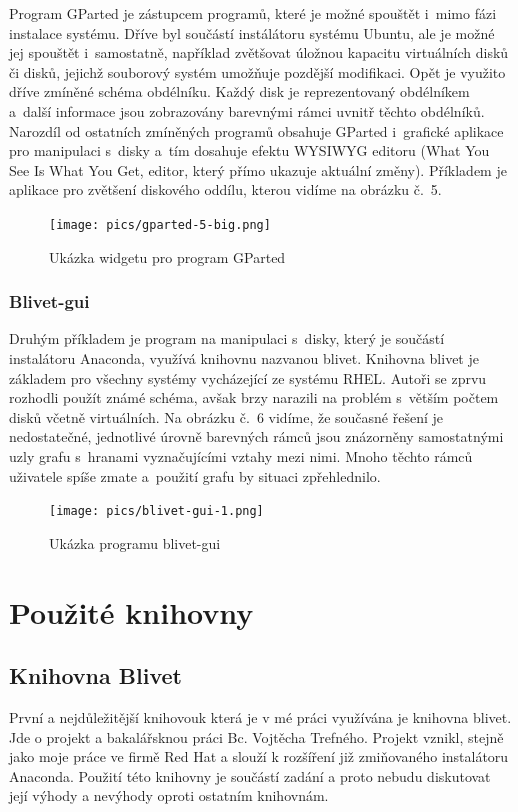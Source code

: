 \documentclass[color,table,oneside,nolot,nolof]{fithesis}
\begin{document}
Program GParted je zástupcem programů, které je možné spouštět i~mimo fázi instalace systému. Dříve byl součástí instálátoru systému Ubuntu, ale je možné jej spouštět i~samostatně, například 
 zvětšovat úložnou kapacitu virtuálních disků či disků, jejichž souborový systém umožňuje pozdější modifikaci. Opět je využito dříve zmíněné schéma obdélníku. Každý disk je reprezentovaný 
 obdélníkem a~další informace jsou zobrazovány barevnými rámci uvnitř těchto obdélníků. Narozdíl od ostatních zmíněných programů obsahuje GParted i~grafické aplikace pro manipulaci s~disky 
 a~tím dosahuje efektu WYSIWYG editoru (What You See Is What You Get, editor, který přímo ukazuje aktuální změny). Příkladem je aplikace pro zvětšení diskového oddílu, kterou vidíme na obrázku č.~5.

 \begin{figure}[h!]
	 \label{fig:gparted}
	 \caption{Ukázka widgetu pro program GParted~\cite{GParted}}
	 \centering
	 \texttt{[image: pics/gparted-5-big.png]}\\
 \end{figure}

 \subsection{Blivet-gui}

 Druhým příkladem je program na manipulaci s~disky, který je součástí instalátoru Anaconda, využívá knihovnu nazvanou blivet. Knihovna blivet je základem pro všechny systémy vycházející ze systému RHEL. Autoři 
 se zprvu rozhodli použít známé schéma, avšak brzy narazili na problém s~větším počtem disků včetně virtuálních. Na obrázku č.~6 vidíme, že současné řešení je nedostatečné, jednotlivé úrovně barevných rámců 
 jsou znázorněny samostatnými uzly grafu s~hranami vyznačujícími vztahy mezi nimi. Mnoho těchto rámců uživatele spíše zmate a~použití grafu by situaci zpřehlednilo.

 \begin{figure}[h!]
	 \label{fig:blivet}
	 \caption{Ukázka programu blivet-gui~\cite{blivet-gui}}
	 \centering
	 \texttt{[image: pics/blivet-gui-1.png]}\\
 \end{figure}

\chapter{Použité knihovny}
\section{Knihovna Blivet}
	První a nejdůležitější knihovouk která je v mé práci využívána je knihovna blivet. Jde o projekt a bakalářsknou práci Bc. Vojtěcha Trefného. Projekt vznikl, stejně jako moje
	práce ve firmě Red Hat a slouží k rozšíření již zmiňovaného instalátoru Anaconda. Použití této knihovny je součástí zadání a proto nebudu diskutovat její výhody a nevýhody
	oproti ostatním knihovnám. 
\end{document}
